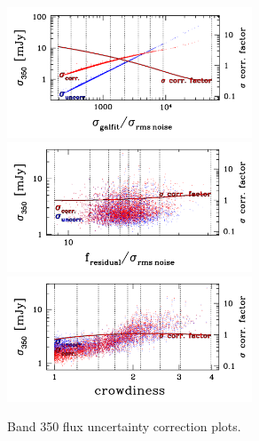\documentclass[11pt,a4paper]{article}
\begin{document}
\begin{figure}[H]
	\caption{
	    Band 350 flux uncertainty correction plots.
	}
	\includegraphics[width=0.65\textwidth]{galsim_350_dfcorr_1}
	\includegraphics[width=0.65\textwidth]{galsim_350_dfcorr_2}
	\includegraphics[width=0.65\textwidth]{galsim_350_dfcorr_3}
\end{figure}
\end{document}
